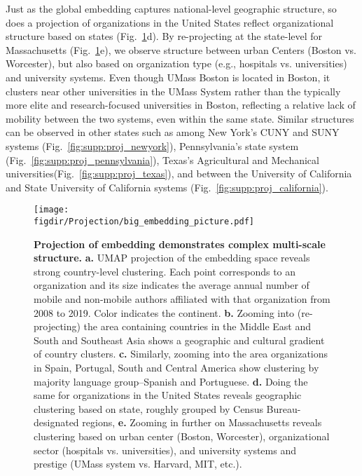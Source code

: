 \documentclass[12pt]{article} %
\def\figdir{../Figs}
\begin{document}
Just as the global embedding captures national-level geographic structure, so does a projection of organizations in the United States reflect organizational structure based on states (Fig.~\ref{fig:projection}d).
By re-projecting at the state-level for Massachusetts (Fig.~\ref{fig:projection}e), we observe structure between urban Centers (Boston vs. Worcester), but also based on organization type (e.g., hospitals vs. universities) and university systems.
Even though UMass Boston is located in Boston, it clusters near other universities in the UMass System rather than the typically more elite and research-focused universities in Boston, reflecting a relative lack of mobility between the two systems, even within the same state.
Similar structures can be observed in other states such as among New York's CUNY and SUNY systems (Fig.~\ref{fig:supp:proj_newyork}), Pennsylvania's state system (Fig.~\ref{fig:supp:proj_pennsylvania}), Texas's Agricultural and Mechanical universities(Fig.~\ref{fig:supp:proj_texas}), and between the University of California and State University of California systems (Fig.~\ref{fig:supp:proj_california}). 

\begin{figure}[hp!]
	\centering
	\texttt{[image: \\figdir/Projection/big\_embedding\_picture.pdf]}
	\caption{
		\textbf{Projection of embedding demonstrates complex multi-scale structure.}
		\textbf{a.}
		UMAP projection \autocite{mcinnes2018umap} of the embedding space reveals strong country-level clustering.
		Each point corresponds to an organization and its size indicates the average annual number of mobile and non-mobile authors affiliated with that organization from 2008 to 2019. 
		Color indicates the continent.
		\textbf{b.} Zooming into (re-projecting) the area containing countries in the Middle East and South and Southeast Asia shows a geographic and cultural gradient of country clusters. 
		\textbf{c.} Similarly, zooming into the area organizations in Spain, Portugal, South and Central America show clustering by majority language group--Spanish and Portuguese.
		\textbf{d.} Doing the same for organizations in the United States reveals geographic clustering based on state, roughly grouped by Census Bureau-designated regions,
		\textbf{e.} Zooming in further on Massachusetts reveals clustering based on urban center (Boston, Worcester), organizational sector (hospitals vs. universities), and university systems and prestige (UMass system vs. Harvard, MIT, etc.).
	}
	\label{fig:projection}
\end{figure}
\end{document}
